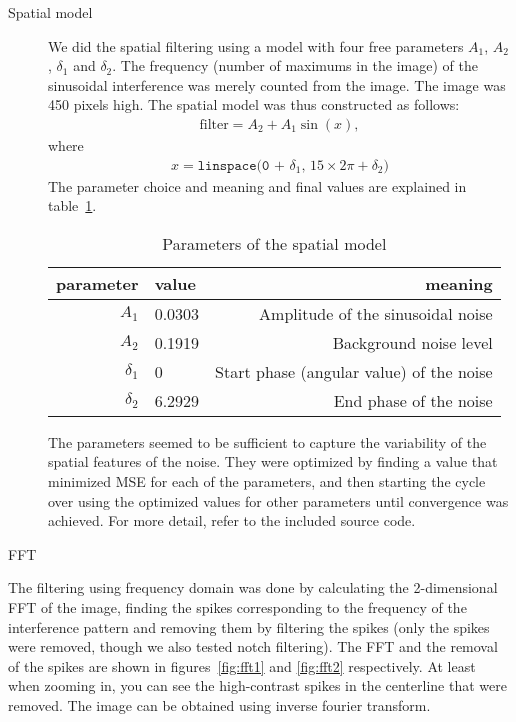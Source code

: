 \documentclass{article}
\begin{document}
\begin{spacing}{1.1}
{\begin{description}
    \item[Spatial model]
We did the spatial filtering using a model with four free parameters $A_1$,
$A_2$, $\delta_1$ and $\delta_2$. The frequency (number of maximums in the
image) of the sinusoidal interference was merely counted from the image. The
image was 450 pixels high. The spatial model was thus constructed as follows:
\begin{align}
    \mathrm{filter} = A_2 + A_1\sin(x),
\end{align}
where
\begin{align}
    x = \texttt{linspace(0 + $\delta_1$, $15\times2\pi + \delta_2$)}
\end{align}
The parameter choice and meaning and final values are explained in table~\ref{tab:var}.
\begin{table}[h]
    \centering
    \caption{Parameters of the spatial model}
    \label{tab:var}
    \begin{tabular}{rlr}
        \toprule
        parameter  & value& meaning\\
        \midrule
        $A_1$ & 0.0303 & Amplitude of the sinusoidal noise\\
        $A_2$ & 0.1919& Background noise level \\
   $\delta_1$ & 0& Start phase (angular value) of the noise \\
   $\delta_2$ & 6.2929 & End phase of the noise \\
        \bottomrule
    \end{tabular}
\end{table}

The parameters seemed to be sufficient to capture the variability of the
spatial features of the noise. They were optimized by finding a value that
minimized MSE for each of the parameters, and then starting the cycle over
using the optimized values for other parameters until convergence was achieved.
For more detail, refer to the included source code.
\item[FFT]
\end{description}

The filtering using frequency domain was done by calculating the 2-dimensional
FFT of the image, finding the spikes corresponding to the frequency of the
interference pattern and removing them by filtering the spikes (only the spikes
were removed, though we also tested notch filtering). The FFT and the removal
of the spikes are shown in figures~\ref{fig:fft1} and \ref{fig:fft2}
respectively. At least when zooming in, you can see the high-contrast spikes in
the centerline that were removed. The image can be obtained using inverse
fourier transform.

}
\end{spacing}
\end{document}
